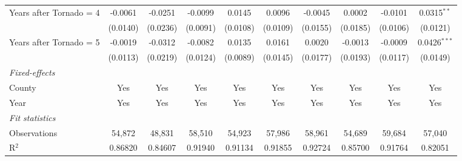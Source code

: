 \documentclass[letterpaper]{article}
\begin{document}
\begin{table}[H]
{\begin{tabular}{lccccccccc}
   Years after Tornado = 4      & -0.0061                           & -0.0251                          & -0.0099                            & 0.0145                             & 0.0096                       & -0.0045                          & 0.0002                      & -0.0101                    & 0.0315$^{**}$\\   
                                             & (0.0140)                          & (0.0236)                         & (0.0091)                           & (0.0108)                           & (0.0109)                     & (0.0155)                         & (0.0185)                    & (0.0106)                   & (0.0121)\\   
   Years after Tornado = 5      & -0.0019                           & -0.0312                          & -0.0082                            & 0.0135                             & 0.0161                       & 0.0020                           & -0.0013                     & -0.0009                    & 0.0426$^{***}$\\   
                                             & (0.0113)                          & (0.0219)                         & (0.0124)                           & (0.0089)                           & (0.0145)                     & (0.0177)                         & (0.0193)                    & (0.0117)                   & (0.0149)\\   
   
   \midrule
   \emph{Fixed-effects}\\
   County                                    & Yes                               & Yes                              & Yes                                & Yes                                & Yes                          & Yes                              & Yes                         & Yes                        & Yes\\  
   Year                                      & Yes                               & Yes                              & Yes                                & Yes                                & Yes                          & Yes                              & Yes                         & Yes                        & Yes\\  
   \midrule
   \emph{Fit statistics}\\
   Observations                              & 54,872                            & 48,831                           & 58,510                             & 54,923                             & 57,986                       & 58,961                           & 54,689                      & 59,684                     & 57,040\\  
   R$^2$                                     & 0.86820                           & 0.84607                          & 0.91940                            & 0.91134                            & 0.91855                      & 0.92724                          & 0.85700                     & 0.91764                    & 0.82051\\  


\end{tabular}}
\end{table}
\end{document}
